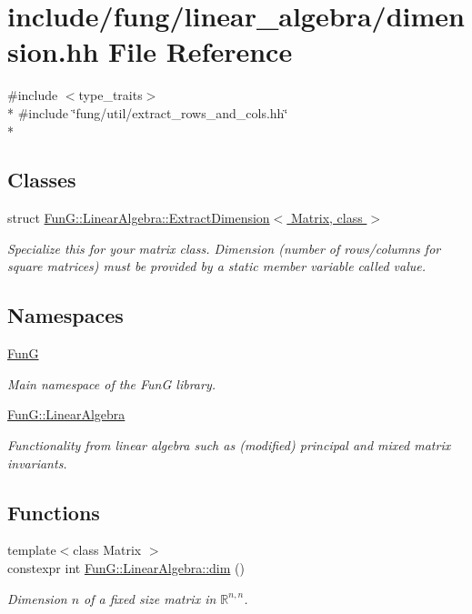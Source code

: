 \hypertarget{dimension_8hh}{\section{include/fung/linear\-\_\-algebra/dimension.hh File Reference}
\label{dimension_8hh}
}
{\ttfamily \#include $<$type\-\_\-traits$>$}\\*
{\ttfamily \#include \char`\"{}fung/util/extract\-\_\-rows\-\_\-and\-\_\-cols.\-hh\char`\"{}}\\*
\subsection*{Classes}
\begin{DoxyCompactItemize}
\item 
struct \hyperlink{structFunG_1_1LinearAlgebra_1_1ExtractDimension}{Fun\-G\-::\-Linear\-Algebra\-::\-Extract\-Dimension$<$ Matrix, class $>$}
\begin{DoxyCompactList}\small\item\em Specialize this for your matrix class. Dimension (number of rows/columns for square matrices) must be provided by a static member variable called value. \end{DoxyCompactList}\end{DoxyCompactItemize}
\subsection*{Namespaces}
\begin{DoxyCompactItemize}
\item 
\hyperlink{namespaceFunG}{Fun\-G}
\begin{DoxyCompactList}\small\item\em Main namespace of the Fun\-G library. \end{DoxyCompactList}\item 
\hyperlink{namespaceFunG_1_1LinearAlgebra}{Fun\-G\-::\-Linear\-Algebra}
\begin{DoxyCompactList}\small\item\em Functionality from linear algebra such as (modified) principal and mixed matrix invariants. \end{DoxyCompactList}\end{DoxyCompactItemize}
\subsection*{Functions}
\begin{DoxyCompactItemize}
\item 
{\footnotesize template$<$class Matrix $>$ }\\constexpr int \hyperlink{namespaceFunG_1_1LinearAlgebra_a13a029820c29d530274ae94968d642d4}{Fun\-G\-::\-Linear\-Algebra\-::dim} ()
\begin{DoxyCompactList}\small\item\em Dimension $n$ of a fixed size matrix in $\mathbb{R}^{n,n}$. \end{DoxyCompactList}\end{DoxyCompactItemize}
